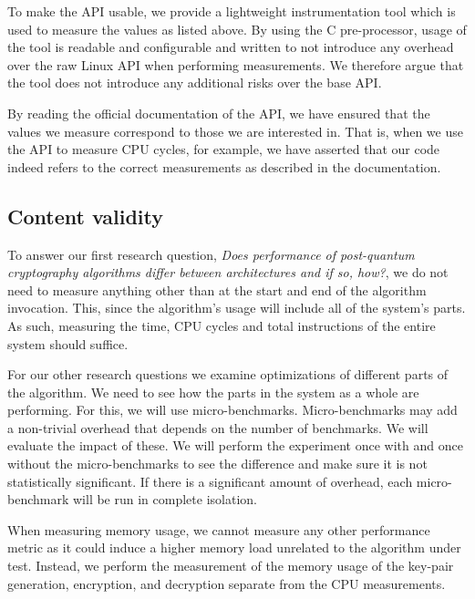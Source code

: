 To make the API usable, we provide a lightweight instrumentation tool which is used to measure the values as listed above. By using the C pre-processor, usage of the tool is readable and configurable and written to not introduce any overhead over the raw Linux API when performing measurements. We therefore argue that the tool does not introduce any additional risks over the base API.

By reading the official documentation of the API, we have ensured that the values we measure correspond to those we are interested in. That is, when we use the API to measure CPU cycles, for example, we have asserted that our code indeed refers to the correct measurements as described in the documentation.

\subsection{Content validity}


To answer our first research question, \textit{Does performance of post-quantum cryptography algorithms differ between architectures and if so, how?},  we do not need to measure anything other than at the start and end of the algorithm invocation. This, since the algorithm's usage will include all of the system's parts. As such, measuring the time, CPU cycles and total instructions of the entire system should suffice.

For our other research questions we examine optimizations of different parts of the algorithm. We need to see how the parts in the system as a whole are performing. For this, we will use micro-benchmarks. Micro-benchmarks may add a non-trivial overhead that depends on the number of benchmarks. We will evaluate the impact of these. We will perform the experiment once with and once without the micro-benchmarks to see the difference and make sure it is not statistically significant. If there is a significant amount of overhead, each micro-benchmark will be run in complete isolation.

When measuring memory usage, we cannot measure any other performance metric as it could induce a higher memory load unrelated to the algorithm under test. Instead, we perform the measurement of the memory usage of the key-pair generation, encryption, and decryption separate from the CPU measurements.

